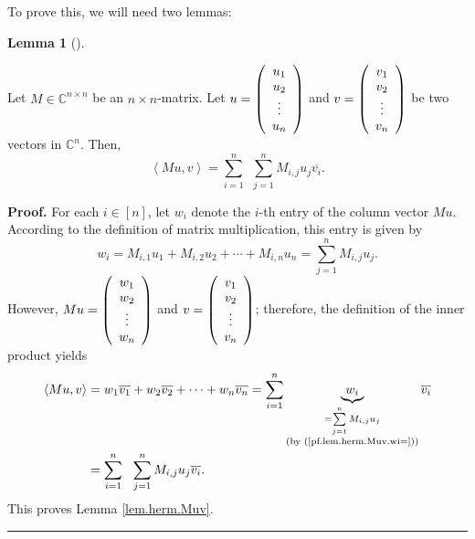 \documentclass[numbers=enddot,12pt,final,onecolumn,notitlepage]{scrartcl}%
\numberwithin{exer}{subsection}
\theoremstyle{definition}
\newtheorem{lem}[theo]{Lemma}
\newenvironment{lemma}[1][]
{\begin{lem}[#1]\begin{leftbar}}
{\end{leftbar}\end{lem}}
\newenvironment{proof}[1][Proof]{\noindent\textbf{#1.} }{\ \rule{0.5em}{0.5em}}
\let\sumnonlimits\sum
\renewcommand{\sum}{\sumnonlimits\limits}
\begin{document}
To prove this, we will need two lemmas:

\begin{lemma}
\label{lem.herm.Muv}Let $M\in\mathbb{C}^{n\times n}$ be an $n\times n$-matrix.
Let $u=\left(
\begin{array}
[c]{c}%
u_{1}\\
u_{2}\\
\vdots\\
u_{n}%
\end{array}
\right)  $ and $v=\left(
\begin{array}
[c]{c}%
v_{1}\\
v_{2}\\
\vdots\\
v_{n}%
\end{array}
\right)  $ be two vectors in $\mathbb{C}^{n}$. Then,%
\[
\left\langle Mu,v\right\rangle =\sum_{i=1}^{n}\ \ \sum_{j=1}^{n}M_{i,j}%
u_{j}\overline{v_{i}}.
\]

\end{lemma}

\begin{proof}
For each $i\in\left[  n\right]  $, let $w_{i}$ denote the $i$-th entry of the
column vector $Mu$. According to the definition of matrix multiplication, this
entry is given by%
\begin{equation}
w_{i}=M_{i,1}u_{1}+M_{i,2}u_{2}+\cdots+M_{i,n}u_{n}=\sum_{j=1}^{n}M_{i,j}%
u_{j}. \label{pf.lem.herm.Muv.wi=}%
\end{equation}
However, $Mu=\left(
\begin{array}
[c]{c}%
w_{1}\\
w_{2}\\
\vdots\\
w_{n}%
\end{array}
\right)  $ and $v=\left(
\begin{array}
[c]{c}%
v_{1}\\
v_{2}\\
\vdots\\
v_{n}%
\end{array}
\right)  $; therefore, the definition of the inner product yields%
\begin{align*}
\left\langle Mu,v\right\rangle  &  =w_{1}\overline{v_{1}}+w_{2}\overline
{v_{2}}+\cdots+w_{n}\overline{v_{n}}=\sum_{i=1}^{n}\underbrace{w_{i}%
}_{\substack{=\sum_{j=1}^{n}M_{i,j}u_{j}\\\text{(by (\ref{pf.lem.herm.Muv.wi=}%
))}}}\overline{v_{i}}\\
&  =\sum_{i=1}^{n}\ \ \sum_{j=1}^{n}M_{i,j}u_{j}\overline{v_{i}}.
\end{align*}
This proves Lemma \ref{lem.herm.Muv}.
\end{proof}
\end{document}
